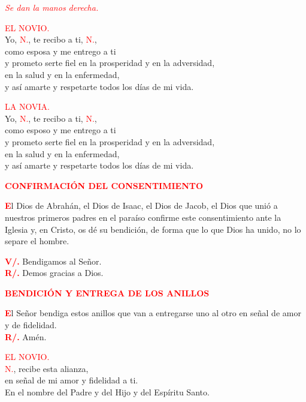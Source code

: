 \documentclass[12pt, letterpaper]{report}
\begin{document}
  \textcolor{red}{ \em Se dan la manos derecha.}

  \textcolor{red}{EL NOVIO.}\\
  Yo, \textcolor{red}{N.}, te recibo a ti, \textcolor{red}{N.}, \\
  como esposa y me entrego a ti\\
  y prometo serte fiel en la prosperidad y en la adversidad, \\
  en la salud y en la enfermedad, \\
  y as\'i amarte y respetarte todos los d\'ias de mi vida.

  \textcolor{red}{LA NOVIA.}\\
  Yo, \textcolor{red}{N.}, te recibo a ti, \textcolor{red}{N.}, \\
  como esposo y me entrego a ti\\
  y prometo serte fiel en la prosperidad y en la adversidad, \\
  en la salud y en la enfermedad, \\
  y as\'i amarte y respetarte todos los d\'ias de mi vida.

  \Large {\bfseries \textcolor{red}{CONFIRMACI\'ON DEL CONSENTIMIENTO}}

  \lettrine[lines=2]{\bfseries \textcolor{red}{E}}{}l Dios de Abrah\'an, el Dios de Isaac, el Dios de Jacob, el Dios que uni\'o a nuestros primeros padres en el para\'iso confirme este consentimiento ante la Iglesia y, en Cristo, os d\'e su bendici\'on, de forma que lo que Dios ha unido, no lo separe el hombre.
  
  \noindent
  \Large {\bfseries \textcolor{red}{V/.}} \hspace{0.5cm} Bendigamos al Se\~nor.\\
  \Large {\bfseries \textcolor{red}{R/.}} \hspace{0.5cm} Demos gracias a Dios.

  \Large {\bfseries \textcolor{red}{BENDICI\'ON Y ENTREGA DE LOS ANILLOS}}

  \lettrine[lines=2]{\bfseries \textcolor{red}{E}}{}\Large l Se\~nor bendiga \Huge \textcolor{red}{} \Large estos anillos que van a entregarse uno al otro en se\~nal de amor y de fidelidad.\\
  \Large {\bfseries \textcolor{red}{R/.}} \hspace{0.5cm} Am\'en.
  
  \textcolor{red}{EL NOVIO.}\\
  \textcolor{red}{N.}, recibe esta alianza, \\
  en se\~nal de mi amor y fidelidad a ti. \\
  En el nombre del Padre y del Hijo y del Esp\'iritu Santo.
\end{document}
